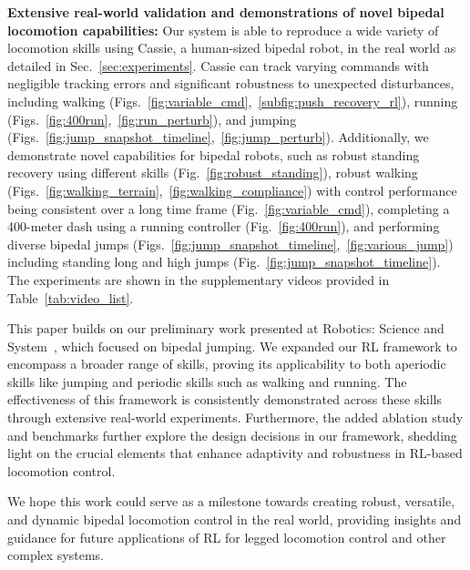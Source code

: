 \textbf{Extensive real-world validation and demonstrations of novel bipedal locomotion capabilities:}
Our system is able to reproduce a wide variety of locomotion skills using Cassie, a human-sized bipedal robot, in the real world as detailed in Sec.~\ref{sec:experiments}. Cassie can track varying commands with negligible tracking errors and significant robustness to unexpected disturbances, including walking (Figs.~\ref{fig:variable_cmd},~\ref{subfig:push_recovery_rl}), running (Figs.~\ref{fig:400run},~\ref{fig:run_perturb}), and jumping (Figs.~\ref{fig:jump_snapshot_timeline},~\ref{fig:jump_perturb}). Additionally, we demonstrate novel capabilities for bipedal robots, such as robust standing recovery using different skills (Fig.~\ref{fig:robust_standing}), robust walking (Figs.~\ref{fig:walking_terrain},~\ref{fig:walking_compliance}) with control performance being consistent over a long time frame (Fig.~\ref{fig:variable_cmd}), completing a 400-meter dash using a running controller (Fig.~\ref{fig:400run}), and performing diverse bipedal jumps (Figs.~\ref{fig:jump_snapshot_timeline},~\ref{fig:various_jump}) including standing long and high jumps (Fig.~\ref{fig:jump_snapshot_timeline}). The
experiments are shown in the supplementary videos provided in Table~\ref{tab:video_list}.

This paper builds on our preliminary work presented at Robotics: Science and System~\citep{li2023robust}, which focused on bipedal jumping. We expanded our RL framework to encompass a broader range of skills, proving its applicability to both aperiodic skills like jumping and periodic skills such as walking and running. The effectiveness of this framework is consistently demonstrated across these skills through extensive real-world experiments. Furthermore, the added ablation study and benchmarks further explore the design decisions in our framework, shedding light on the crucial elements that enhance adaptivity and robustness in RL-based locomotion control.

We hope this work could serve as a milestone towards creating robust, versatile, and dynamic bipedal locomotion control in the real world, providing insights and guidance for future applications of RL for legged locomotion control and other complex systems.  








